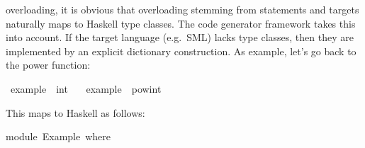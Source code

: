 \begin{isabellebody}
\begin{isamarkuptext}
  overloading, it is obvious that overloading stemming from \hyperlink{command.class}{\mbox{}} statements and \hyperlink{command.instantiation}{\mbox{}} targets naturally
  maps to Haskell type classes.  The code generator framework
  \cite{isabelle-codegen} takes this into account.  If the target
  language (e.g.~SML) lacks type classes, then they are implemented by
  an explicit dictionary construction.  As example, let's go back to
  the power function:%
\end{isamarkuptext}%
\isamarkuptrue%
%
\isadelimquote
%
\endisadelimquote
%
\isatagquote
{}\isamarkupfalse%
\ example\ {}{}\ int\ \isanewline
\ \ {}example\ {}\ pow{}int\ {}{}\ {}{}{}{}{}%
\endisatagquote
{\isafoldquote}%
%
\isadelimquote
%
\endisadelimquote
%
\begin{isamarkuptext}%
\noindent This maps to Haskell as follows:%
\end{isamarkuptext}%
\isamarkuptrue%
%
\isadeliminvisible
%
\endisadeliminvisible
%
\isataginvisible
%
\endisataginvisible
{\isafoldinvisible}%
%
\isadeliminvisible
%
\endisadeliminvisible
%
\isadelimquotetypewriter
%
\endisadelimquotetypewriter
%
\isatagquotetypewriter
%
\begin{isamarkuptext}%
module\ Example\ where\ {}\isanewline
\isanewline

\end{isamarkuptext}
\end{isabellebody}
